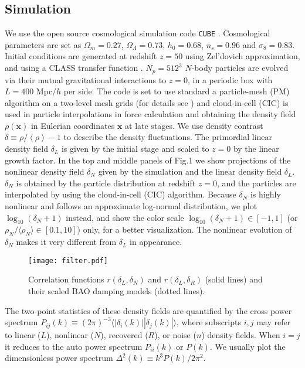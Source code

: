 \documentclass[aps,prd,twocolumn,superscriptaddress,amsfont,amssymb,amsmath,nofootinbib,showpacs,balancelastpage]{revtex4-1}
\newcommand{\bs}{\boldsymbol}
\newcommand{\lb}{\left\langle}
\newcommand{\rb}{\right\rangle}
\begin{document}
\subsection{Simulation}\label{ss.sim}
We use the open source cosmological simulation code {\tt CUBE} %
\citep{cafcube}.
Cosmological parameters are set as
$\Omega_m=0.27$, $\Omega_\Lambda=0.73$, $h_0=0.68$, $n_s=0.96$ and $\sigma_8=0.83$.
Initial conditions are generated at redshift $z=50$
using Zel'dovich approximation, and using a CLASS transfer function
\citep{2011JCAP...07..034B}.
$N_p=512^3$ $N$-body particles are evolved via
their mutual gravitational interactions to $z=0$, in a periodic box with $L=400$
Mpc$/h$ per side. The code is set to use standard a particle-mesh (PM) algorithm
\cite{1988csup.book.....H} on a two-level mesh grids
(for details see \cite{2013MNRAS.436..540H}) and cloud-in-cell
(CIC) is used in particle interpolations in force
calculation and obtaining the density field $\rho({\bs x})$ in Eulerian coordinates
${\bs x}$ at late stages. We use density contrast $\delta\equiv\rho/\lb\rho\rb-1$
to describe the density fluctuations. The primordial linear density field $
\delta_L$ is given by the initial stage and scaled to $z=0$ by the linear growth
factor. In the top and middle panels of Fig.1 we show projections of the nonlinear density field
$\delta_N$ given by the simulation and the linear density field $\delta_L$.
$\delta_N$ is obtained by the particle distribution at redshift $z=0$, and
the particles are interpolated by using the cloud-in-cell (CIC) algorithm.
Because $\delta_N$ is highly nonlinear and follows an approximate
log-normal distribution, we plot $\log_{10}(\delta_N+1)$ instead, and show
the color scale $\log_{10}(\delta_N+1)\in[-1,1]$ (or $\rho_N/\langle\rho_N\rangle\in[0.1,10]$)
only, for a better visualization.
The nonlinear evolution of $\delta_N$ makes it very different from $\delta_L$
in appearance.

\begin{figure}[t] \centering
  \texttt{[image: filter.pdf]}
  \caption{Correlation functions $r(\delta_L,\delta_N)$ and $r(\delta_L,\delta_R)$
  (solid lines) and their scaled BAO damping models (dotted lines).}
  \label{fig.corr}
\end{figure}


The two-point statistics of these density fields are quantified by the cross power
spectrum $P_{ij}(k)\equiv(2\pi)^{-3}\langle|\delta_i(k)||\delta_j(k)|\rangle$,
where subscripts $i,j$ may refer to linear ($L$), nonlinear ($N$),
recovered ($R$), or noise ($n$) density
fields. When $i=j$ it reduces to the auto power spectrum $P_{ii}(k)$ or $P(k)$. We
usually plot the dimensionless power spectrum $\Delta^2(k)\equiv k^3P(k)/2\pi^2$.
\end{document}

